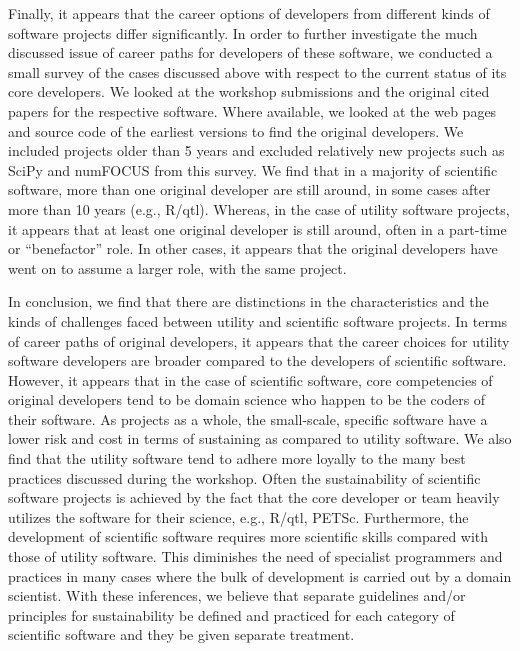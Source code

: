 \documentclass[11pt, oneside]{amsart}
\newcommand{\toolname}[1] {\textsf{#1}}
\begin{document}
Finally, it appears that the career options of developers from different kinds
of software projects differ significantly. In order to further investigate the
much discussed issue of career paths for developers of these software, we
conducted a small survey of the cases discussed above with respect to the
current status of its core developers. We looked at the workshop submissions
and the original cited papers for the respective software. Where available, we
looked at the web pages and source code of the earliest versions to find the
original developers. We included projects older than 5 years and excluded
relatively new projects such as \toolname{SciPy} and \toolname{numFOCUS} from
this survey. We find that in a majority of scientific software, more than one
original developer are still around, in some cases after more than 10 years
(e.g., \toolname{R/qtl}).  Whereas, in the case of utility software projects, it
appears that at least one original developer is still around, often in a
part-time or ``benefactor'' role. In other cases, it appears that the original
developers have went on to assume a larger role, with the same project.

In conclusion, we find that there are distinctions in the characteristics and
the kinds of challenges faced between utility and scientific software projects.
In terms of career paths of original developers, it appears that the career
choices for utility software developers are broader compared to the developers
of scientific software. However, it appears that in the case of scientific
software, core competencies of original developers tend to be domain science
who happen to be the coders of their software. As projects as a whole, the
small-scale, specific software have a lower risk and cost in terms of
sustaining as compared to utility software. We also find that the utility
software tend to adhere more loyally to the many best practices discussed
during the workshop. Often the sustainability of scientific software projects
is achieved by the fact that the core developer or team heavily utilizes the
software for their science, e.g.,  \toolname{R/qtl, PETSc}.  Furthermore, the
development of scientific software requires more scientific skills compared
with those of utility software. This diminishes the need of specialist
programmers and practices in many cases where the bulk of development is
carried out by a domain scientist. With these inferences, we believe that
separate guidelines and/or principles for sustainability be defined and
practiced for each category of scientific software and they be given separate
treatment.
\end{document}
